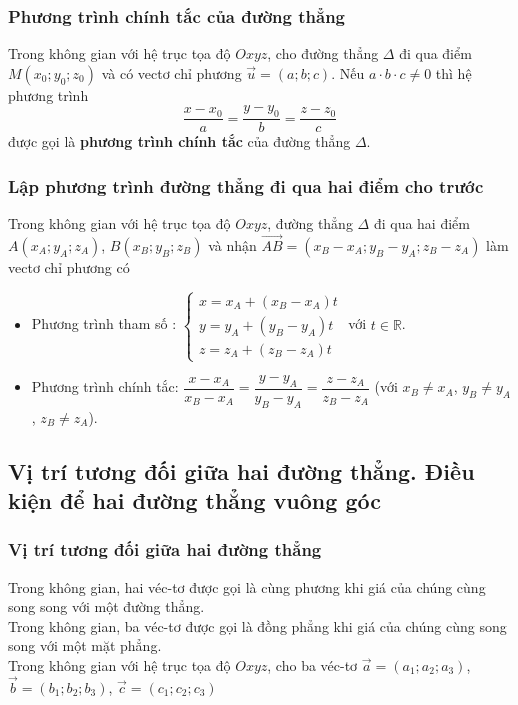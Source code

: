 \subsubsection{Phương trình chính tắc của đường thẳng}

 Trong không gian với hệ trục tọa độ $Oxyz$, cho đường thẳng $\Delta $ đi qua điểm $M(x_{0} ;y_{0} ;z_{0} )$ và có vectơ chỉ phương $\overrightarrow{u}=(a;b;c)$. Nếu $a\cdot b\cdot c\ne 0$ thì hệ phương trình $$\dfrac{x-x_{0} }{a} =\dfrac{y-y_{0} }{b} =\dfrac{z-z_{0} }{c} $$ được gọi là \textbf{phương trình chính tắc} của đường thẳng $\Delta $.


\subsubsection{Lập phương trình đường thẳng đi qua hai điểm cho trước}

 Trong không gian với hệ trục tọa độ $Oxyz$, đường thẳng $\Delta $ đi qua hai điểm $A(x_{A} ;y_{A} ;z_{A} )$, $B(x_{B} ;y_{B} ;z_{B} )$ và nhận $\overrightarrow{AB}=(x_{B} -x_{A} ;y_{B} -y_{A} ;z_{B} -z_{A} )$ làm vectơ chỉ phương có
\begin{itemize}
	\item  Phương trình tham số : $\left\{\begin{array}{l} {x=x_{A} +(x_{B} -x_{A} )t} \\ {y=y_{A} +(y_{B} -y_{A} )t} \\ {z=z_{A} +(z_{B} -z_{A} )t} \end{array}\right. $ với $t\in  \mathbb{R}$.
	\item  Phương trình chính tắc: $\dfrac{x-x_{A} }{x_{B} -x_{A} } =\dfrac{y-y_{A} }{y_{B} -y_{A} } =\dfrac{z-z_{A} }{z_{B} -z_{A} } $ (với $x_{B} \ne x_{A}$, $y_{B} \ne y_{A}$, $z_{B} \ne z_{A} $).
\end{itemize}

 \subsection{Vị trí tương đối giữa hai đường thẳng. Điều kiện để hai đường thẳng vuông góc}
\subsubsection{Vị trí tương đối giữa hai đường thẳng}

 Trong không gian, hai véc-tơ được gọi là cùng phương khi giá của chúng cùng song song với một đường thẳng.\\
 Trong không gian, ba véc-tơ được gọi là đồng phẳng khi giá của chúng cùng song song với một mặt phẳng.\\
 Trong không gian với hệ trục tọa độ $Oxyz$, cho ba véc-tơ $\overrightarrow{a}=(a_{1} ;a_{2} ;a_{3} )$, $\overrightarrow{b}=(b_{1} ;b_{2} ;b_{3} )$, $\overrightarrow{c}=(c_{1} ;c_{2} ;c_{3} )$


